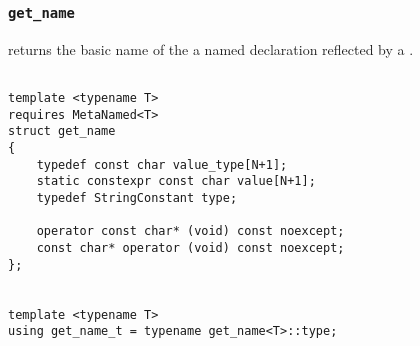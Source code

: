 
\subsubsection{\texttt{get\_name}}

returns the basic name of the a named declaration reflected by a .

\begin{verbatim}

template <typename T>
requires MetaNamed<T>
struct get_name
{
	typedef const char value_type[N+1];
	static constexpr const char value[N+1];
	typedef StringConstant type;

	operator const char* (void) const noexcept;
	const char* operator (void) const noexcept;
};


template <typename T>
using get_name_t = typename get_name<T>::type;

\end{verbatim}
